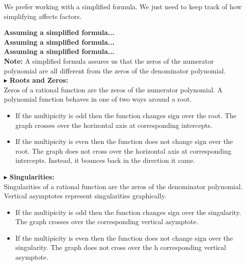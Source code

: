 \documentclass{ximera}
\begin{document}
We prefer working with a simplified formula.  We just need to keep track of how simplifying affects factors.


\textbf{\textcolor{red!25!blue!75!}{Assuming a simplified formula...}} \\

\textbf{\textcolor{red!90!darkgray}{Assuming a simplified formula...}} \\

\textbf{\textcolor{red!90!black}{Assuming a simplified formula...}} \\


\textbf{Note:} A simplified formula assures us that the zeros of the numerator polynomial are all different from the zeros of the denominator polynomial. \\





$\blacktriangleright$ \textbf{\textcolor{red!10!blue!90!}{Roots and Zeros:}} \\
   Zeros of a rational function are the zeros of the numerator polynomial.  A polynomial function behaves in one of two ways around a root.

\begin{itemize}
\item If the multipicity is odd then the function changes sign over the root.  The graph crosses over the horizontal axis at corresponding intercepts.
\item If the multipicity is even then the function does not change sign over the root.  The graph does not cross over the horizontal axis at corresponding intercepts. Instead, it bounces back in the direction it came.
\end{itemize}






$\blacktriangleright$ \textbf{\textcolor{red!10!blue!90!}{Singularities:}} \\
Singularities of a rational function are the zeros of the denominator polynomial.  Vertical asymptotes represent singularities graphically.

\begin{itemize}
\item If the multipicity is odd then the function changes sign over the singularity.  The graph crosses over the corresponding vertical asymptote.
\item If the multipicity is even then the function does not change sign over the singularity.  The graph does not cross over the h corresponding vertical asymptote. 
\end{itemize}
\end{document}
